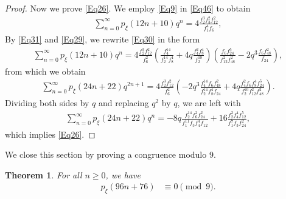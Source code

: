 \documentclass[12pt]{article}
\newtheorem{theorem}{Theorem}[section]
\begin{document}
\begin{proof}
Now we prove \eqref{Eq26}. We employ \eqref{Eq9} in \eqref{Eq46} to obtain 
\begin{align}
\sum_{n=0}^{\infty} p_{\xi}(12n+10)q^{n} = 4\frac{f_{2}^3f_3^2f_{12}^2}{f_{1}^4f_6},
\label{Eq30}
\end{align}
By \eqref{Eq31} and \eqref{Eq29}, we rewrite \eqref{Eq30} in the form
\begin{align*}
\sum_{n=0}^{\infty} p_{\xi}(12n+10)q^{n} = 4\frac{f_{2}^3f_{12}^2}{f_{6}^2} \left( \frac{f_4^{14}}{f_2^{14}f_8^4} +4q \frac{f_4^2f_8^4}{f_2^{10}} \right) \left( \frac{f_6f_{24}^5}{f_{12}^2f_{48}^2} -2q^3 \frac{f_6f_{48}^2}{f_24} \right),
\end{align*}
from which we obtain
\begin{align*}
\sum_{n=0}^{\infty} p_{\xi}(24n+22)q^{2n+1} = 4\frac{f_{2}^3f_{12}^2}{f_{6}^2} \left( -2q^3\frac{f_4^{14}f_6f_{48}^2}{f_2^{14}f_8^4f_{24}} +4q \frac{f_4^2f_6f_8^4f_{24}^5}{f_2^{10}f_{12}^2f_{48}^2} \right).
\end{align*}
Dividing both sides by $q$ and replacing $q^2$ by $q$, we are left with
\begin{align*}
\sum_{n=0}^{\infty} p_{\xi}(24n+22)q^{n} =  -8q\frac{f_2^{14}f_6^2f_{24}^2}{f_1^{11}f_3f_4^4f_{12}} +16 \frac{f_2^2f_4^4f_{12}^5}{f_1^{7}f_3f_{24}^2},
\end{align*}
which implies \eqref{Eq26}.
\end{proof}		
		
We close this section by proving a congruence modulo 9.  		
\begin{theorem} 
\label{thm:96_76}
For all $n \geq 0$, we have
\begin{align}
p_{\xi}(96n+76) & \equiv 0 \pmod{9}. \label{Eq43}
\end{align}
\end{theorem}		
\end{document}
